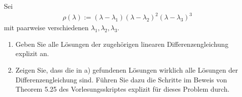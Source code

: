 \begin{exercise}
Sei
\begin{align}
  \rho(\lambda) := (\lambda - \lambda_1)(\lambda - \lambda_2)^2(\lambda - \lambda_3)^3
\end{align}
mit paarweise verschiedenen $\lambda_1,\lambda_2,\lambda_3$.
\begin{enumerate}[label = \textbf{\alph*)}]
  \item Geben Sie alle Lösungen der zugehörigen linearen Differenzengleichung explizit an.
  \item Zeigen Sie, dass die in a) gefundenen Lösungen wirklich alle Lösungen
  der Differenzengleichung sind. Führen Sie dazu die Schritte im Beweis von
  Theorem 5.25 des Vorlesungsskriptes explizit für dieses Problem durch.
\end{enumerate}
\end{exercise}
